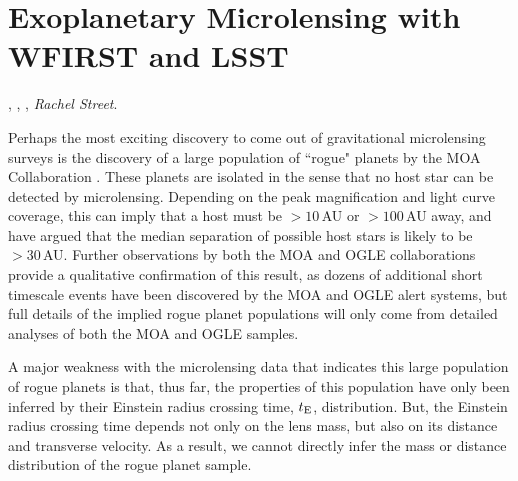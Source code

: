 %
%
%
%

\section{Exoplanetary Microlensing with WFIRST and LSST}
\def\secname{\chpname:microlensing}\label{sec:\secname}

,
,
,
{\it Rachel Street}.


Perhaps the most exciting discovery to come out of gravitational
microlensing surveys is the discovery of a large population of ``rogue"
planets by the MOA Collaboration \citep{2011Natur.473..349S}. These planets
are isolated in the sense that no host star can be detected
by microlensing. Depending on the peak magnification and light curve
coverage, this can imply that a host must be $> 10\,$AU or $> 100\,$AU away,
and \citet{2012ApJ...757..119B} have argued that the median separation
of possible host stars is likely to be $> 30\,$AU.
Further observations by both the MOA and OGLE collaborations provide
a qualitative confirmation of this result, as dozens of additional
short timescale events have been discovered by the MOA and OGLE
alert systems, but full details of the implied rogue planet
populations  will only come from detailed analyses of both the MOA
and OGLE samples.

A major weakness with the microlensing data that indicates this
large population of rogue planets is that, thus far, the properties
of this population have only been inferred by their Einstein radius
crossing time, $t_{\rm E}$, distribution. But, the Einstein radius crossing
time depends not only on the lens mass, but also on its distance and
transverse velocity. As a result, we cannot directly infer the mass or distance
distribution of the rogue planet sample.


